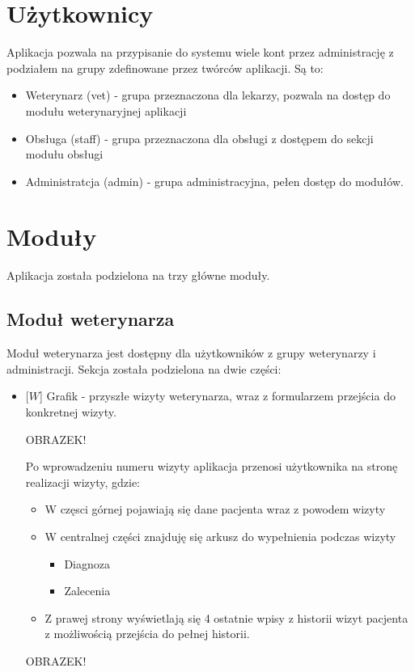 \documentclass[10pt,a4paper]{article}
\begin{document}
	
	
	
	
	\section {Użytkownicy}
		Aplikacja pozwala na przypisanie do systemu wiele kont przez administrację z podziałem na grupy zdefinowane przez twórców aplikacji. Są to:
		\begin{itemize}
			\item Weterynarz (vet) - grupa przeznaczona dla lekarzy, pozwala na dostęp do modułu weterynaryjnej aplikacji
			\item Obsługa (staff) - grupa przeznaczona dla obsługi z dostępem do sekcji modułu obsługi
			\item Administratcja (admin) - grupa administracyjna, pełen dostęp do modułów. 
		\end{itemize}
	
	\section{Moduły}
	Aplikacja została podzielona na trzy główne moduły. 
	\subsection{Moduł weterynarza}
	Moduł weterynarza jest dostępny dla użytkowników z grupy weterynarzy i administracji. Sekcja została podzielona na dwie części:
	\begin{itemize}
		\item $[W$] Grafik - przyszłe wizyty weterynarza, wraz z formularzem przejścia do konkretnej wizyty. 
		
		OBRAZEK!
		
		Po wprowadzeniu numeru wizyty aplikacja przenosi użytkownika na stronę realizacji wizyty, gdzie:
			\begin{itemize}
				\item W częsci górnej pojawiają się dane pacjenta wraz z powodem wizyty
				\item W centralnej części znajduję się arkusz do wypełnienia podczas wizyty
					\begin{itemize}
						\item Diagnoza
						\item Zalecenia
					\end{itemize}
				\item Z prawej strony wyświetlają się 4 ostatnie wpisy z historii wizyt pacjenta z możliwością przejścia do pełnej historii.
			
			\end{itemize}
		
		OBRAZEK!
		
	\end{itemize}	
		
\end{document}
